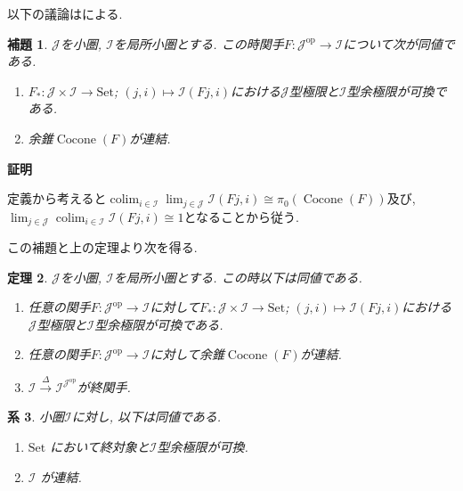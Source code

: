 \documentclass{ltjsarticle}
\makeatletter
\theoremstyle{mystyle}
\newtheorem{theorem}{定理}[section]
\newtheorem{lemma}[theorem]{補題}
\newtheorem{corollary}[theorem]{系} %
\renewcommand{\proofname}{\textbf{証明}}
\renewenvironment{proof}[1][\proofname]{\par
  \pushQED{\qed}
  \normalfont \topsep6\p@\@plus6\p@\relax
  \trivlist
  \item\relax
  {#1\@addpunct{\newline\ignorespaces}}%
}{
  \popQED\endtrivlist\@endpefalse
}
\makeatother
\begin{document}
以下の議論は\cite{CommLimColim}による. 
\begin{lemma}
  $\mathcal J$を小圏, $\mathcal I$を局所小圏とする. この時関手$F:\mathcal J^{\mathrm{op}}\to\mathcal I$について次が同値である.
  \begin{enumerate}
    \item $F_*:\mathcal J\times \mathcal I\to\mathrm{Set}$; $(j,i)\mapsto\mathcal I(Fj,i)$における$\mathcal J$型極限と$\mathcal I$型余極限が可換である.
    \item 余錐$\operatorname{Cocone}(F)$が連結.
  \end{enumerate}
\end{lemma}
\begin{proof}
  定義から考えると$\operatorname{colim}_{i\in\mathcal I}\operatorname{lim}_{j\in \mathcal J}\mathcal I(Fj,i)\cong\pi_0(\operatorname{Cocone}(F))$及び, 
  $\operatorname{lim}_{j\in \mathcal J}\operatorname{colim}_{i\in\mathcal I}\mathcal I(Fj,i)\cong1$となることから従う.
\end{proof}
この補題と上の定理より次を得る.
\begin{theorem}
  $\mathcal J$を小圏, $\mathcal I$を局所小圏とする. この時以下は同値である.
  \begin{enumerate}
    \item 任意の関手$F:\mathcal J^{\mathrm{op}}\to\mathcal I$に対して$F_*:\mathcal J\times \mathcal I\to\mathrm{Set}$; $(j,i)\mapsto\mathcal I(Fj,i)$における$\mathcal J$型極限と$\mathcal I$型余極限が可換である.
    \item 任意の関手$F:\mathcal J^{\mathrm{op}}\to\mathcal I$に対して余錐$\operatorname{Cocone}(F)$が連結.
    \item $\mathcal I\xrightarrow{\Delta}\mathcal I^{\mathcal J^{\mathrm{op}}}$が終関手.
  \end{enumerate}
\end{theorem}
\begin{corollary}
  小圏$\mathcal I$に対し, 以下は同値である.
  \begin{enumerate}
  \item $\mathrm{Set}$ において終対象と$\mathcal I$型余極限が可換.
  \item $\mathcal I$ が連結. 
  \end{enumerate}
\end{corollary}
\end{document}
